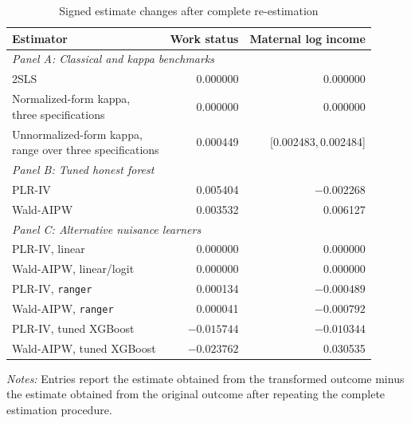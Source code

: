 \documentclass[12pt, a4paper, oneside]{article}
\theoremstyle{plain}
\theoremstyle{definition}
\begin{document}
\begin{table}[H]
\centering
\caption{Signed estimate changes after complete re-estimation}
\label{tab:child_translation}
\footnotesize
\setlength{\tabcolsep}{7pt}
\renewcommand{\arraystretch}{1.02}
\begin{threeparttable}
\begin{tabular}{@{}lrr@{}}
\toprule
Estimator
& Work status
& Maternal log income \\
\midrule

\multicolumn{3}{l}{\textit{Panel A: Classical and kappa benchmarks}} \\[2pt]

2SLS
& 0.000000
& 0.000000 \\

\shortstack[l]{Normalized-form kappa,\\three specifications}
& 0.000000
& 0.000000 \\

\shortstack[l]{Unnormalized-form kappa,\\range over three specifications}
& 0.000449
& [0.002483,\,0.002484] \\[4pt]

\multicolumn{3}{l}{\textit{Panel B: Tuned honest forest}} \\[2pt]

PLR-IV
& 0.005404
& $-0.002268$ \\

Wald-AIPW
& 0.003532
& 0.006127 \\[4pt]

\multicolumn{3}{l}{\textit{Panel C: Alternative nuisance learners}} \\[2pt]

PLR-IV, linear
& 0.000000
& 0.000000 \\

Wald-AIPW, linear/logit
& 0.000000
& 0.000000 \\

PLR-IV, \texttt{ranger}
& 0.000134
& $-0.000489$ \\

Wald-AIPW, \texttt{ranger}
& 0.000041
& $-0.000792$ \\

PLR-IV, tuned XGBoost
& $-0.015744$
& $-0.010344$ \\

Wald-AIPW, tuned XGBoost
& $-0.023762$
& 0.030535 \\

\bottomrule
\end{tabular}

\begin{tablenotes}
\footnotesize
\item \textit{Notes:} Entries report the estimate obtained from the
transformed outcome minus the estimate obtained from the original outcome
after repeating the complete estimation procedure. 
\end{tablenotes}
\end{threeparttable}
\end{table}
\end{document}
